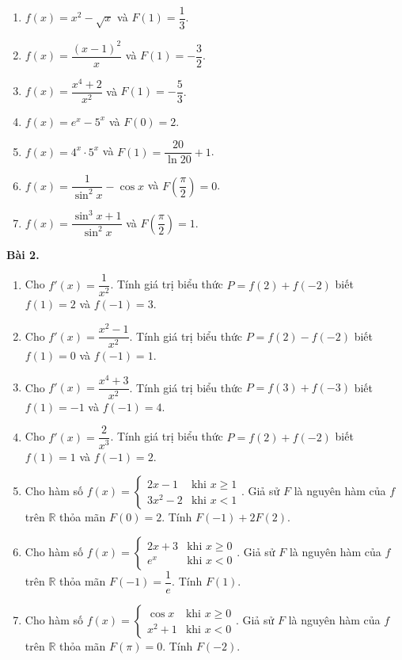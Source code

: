 \documentclass[12pt]{article}
\begin{document}
	\begin{btdo}
		\begin{enumerate}[label=\alph*), resume]
			\item $f(x) = x^2 - \sqrt{x}$ và $F(1) = \dfrac{1}{3}$.
			\item $f(x) = \dfrac{(x-1)^2}{x}$ và $F(1) = -\dfrac{3}{2}$.
			\item $f(x) = \dfrac{x^4 + 2}{x^2}$ và $F(1) = -\dfrac{5}{3}$.
			\item $f(x) = e^x - 5^x$ và $F(0) = 2$.
			\item $f(x) = 4^x \cdot 5^x$ và $F(1) = \dfrac{20}{\ln 20} + 1$.
			\item $f(x) = \dfrac{1}{\sin^2 x} - \cos x$ và $F\left(\dfrac{\pi}{2}\right) = 0$.
			\item $f(x) = \dfrac{\sin^3 x + 1}{\sin^2 x}$ và $F\left(\dfrac{\pi}{2}\right) = 1$.
		\end{enumerate}
	\end{btdo}
	
	\noindent \textbf{Bài 2.}
	
	\begin{btxanh}
		\begin{enumerate}[label=\alph*)]
			\item Cho $f'(x) = \dfrac{1}{x^2}$. Tính giá trị biểu thức $P = f(2) + f(-2)$ biết $f(1) = 2$ và $f(-1) = 3$.
			\item Cho $f'(x) = \dfrac{x^2 - 1}{x^2}$. Tính giá trị biểu thức $P = f(2) - f(-2)$ biết $f(1) = 0$ và $f(-1) = 1$.
			\item Cho $f'(x) = \dfrac{x^4 + 3}{x^2}$. Tính giá trị biểu thức $P = f(3) + f(-3)$ biết $f(1) = -1$ và $f(-1) = 4$.
			\item Cho $f'(x) = \dfrac{2}{x^3}$. Tính giá trị biểu thức $P = f(2) + f(-2)$ biết $f(1) = 1$ và $f(-1) = 2$.
			\item Cho hàm số $f(x) = \begin{cases} 2x - 1 & \text{khi } x \ge 1 \\ 3x^2 - 2 & \text{khi } x < 1 \end{cases}$. Giả sử $F$ là nguyên hàm của $f$ trên $\mathbb{R}$ thỏa mãn $F(0) = 2$. Tính $F(-1) + 2F(2)$.
			\item Cho hàm số $f(x) = \begin{cases} 2x + 3 & \text{khi } x \ge 0 \\ e^x & \text{khi } x < 0 \end{cases}$. Giả sử $F$ là nguyên hàm của $f$ trên $\mathbb{R}$ thỏa mãn $F(-1) = \dfrac{1}{e}$. Tính $F(1)$.
			\item Cho hàm số $f(x) = \begin{cases} \cos x & \text{khi } x \ge 0 \\ x^2 + 1 & \text{khi } x < 0 \end{cases}$. Giả sử $F$ là nguyên hàm của $f$ trên $\mathbb{R}$ thỏa mãn $F(\pi) = 0$. Tính $F(-2)$.
		\end{enumerate}
	\end{btxanh}
	
\end{document}
